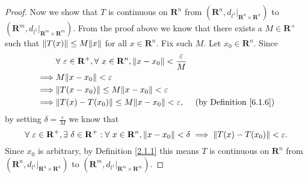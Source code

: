 \begin{proof}
    Now we show that \(T\) is continuous on \(\mathbf{R}^n\) from \((\mathbf{R}^n, d_{l^1}|_{\mathbf{R}^n \times \mathbf{R}^n})\) to \((\mathbf{R}^m, d_{l^1}|_{\mathbf{R}^m \times \mathbf{R}^m})\).
    From the proof above we know that there exists a \(M \in \mathbf{R}^+\) such that \(\norm*{T(x)} \leq M \norm*{x}\) for all \(x \in \mathbf{R}^n\).
    Fix such \(M\).
    Let \(x_0 \in \mathbf{R}^n\).
    Since
    \begin{align*}
                 & \forall\ \varepsilon \in \mathbf{R}^+, \forall\ x \in \mathbf{R}^n, \norm*{x - x_0} < \frac{\varepsilon}{M}                                      \\
        \implies & M \norm*{x - x_0} < \varepsilon                                                                                                                  \\
        \implies & \norm*{T(x - x_0)} \leq M \norm*{x - x_0} < \varepsilon                                                                                          \\
        \implies & \norm*{T(x) - T(x_0)} \leq M \norm*{x - x_0} < \varepsilon,                                                 & \text{(by Definition \ref{6.1.6})}
    \end{align*}
    by setting \(\delta = \frac{\varepsilon}{M}\) we know that
    \[
        \forall\ \varepsilon \in \mathbf{R}^+, \exists\ \delta \in \mathbf{R}^+ : \forall\ x \in \mathbf{R}^n, \norm*{x - x_0} < \delta \implies \norm*{T(x) - T(x_0)} < \varepsilon.
    \]
    Since \(x_0\) is arbitrary, by Definition \ref{2.1.1} this means \(T\) is continuous on \(\mathbf{R}^n\) from \((\mathbf{R}^n, d_{l^1}|_{\mathbf{R}^n \times \mathbf{R}^n})\) to \((\mathbf{R}^m, d_{l^1}|_{\mathbf{R}^m \times \mathbf{R}^m})\).
\end{proof}